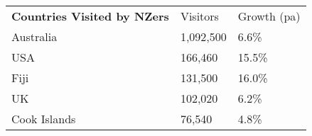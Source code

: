 \begin{tabular}[t]{p{5cm}p{1.3cm}p{1.2cm}}
 \textbf{Countries Visited by NZers} & Visitors & Growth (pa) \\ 
 Australia & 1,092,500 & 6.6\% \\ 
  USA &   166,460 & 15.5\% \\ 
  Fiji &   131,500 & 16.0\% \\ 
  UK &   102,020 & 6.2\% \\ 
  Cook Islands &    76,540 & 4.8\% \\ 
  \end{tabular}
